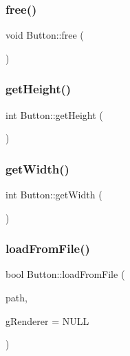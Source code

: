 \subsubsection{\texorpdfstring{free()}{free()}}
{\footnotesize\ttfamily void Button\+::free (\begin{DoxyParamCaption}{ }\end{DoxyParamCaption})}

\mbox{\label{class_button_a9ed8c54a9a7f468ea3fa4417f954ec23}} 
\subsubsection{\texorpdfstring{get\+Height()}{getHeight()}}
{\footnotesize\ttfamily int Button\+::get\+Height (\begin{DoxyParamCaption}{ }\end{DoxyParamCaption})}

\mbox{\label{class_button_a78bb3e6eeb85f91d07c98b392a816f3f}} 
\subsubsection{\texorpdfstring{get\+Width()}{getWidth()}}
{\footnotesize\ttfamily int Button\+::get\+Width (\begin{DoxyParamCaption}{ }\end{DoxyParamCaption})}

\mbox{\label{class_button_aec798706951af6d664a7c88e83b59b73}} 
\subsubsection{\texorpdfstring{load\+From\+File()}{loadFromFile()}}
{\footnotesize\ttfamily bool Button\+::load\+From\+File (\begin{DoxyParamCaption}\item[{std\+::string}]{path,  }\item[{S\+D\+L\+\_\+\+Renderer $\ast$}]{g\+Renderer = {\ttfamily NULL} }\end{DoxyParamCaption})}

